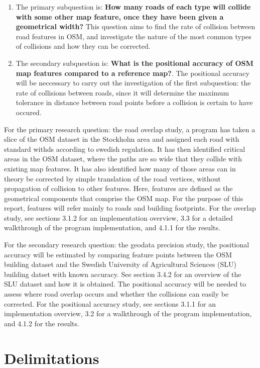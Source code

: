\documentclass{kththesis}
\begin{document}
\begin{enumerate}
    \item The primary subquestion is: \textbf{How many roads of each type will collide with some other map feature, once they have been given a geometrical width?} This question aims to find the rate of collision between road features in OSM, and investigate the nature of the most common types of collisions and how they can be corrected.
    \item The secondary subquestion is: \textbf{What is the positional accuracy of OSM map features compared to a reference map?}. The positional accuracy will be neccessary to carry out the investigation of the first subquestion: the rate of collisions between roads, since it will determine the maximum tolerance in distance between road points before a collision is certain to have occured.
\end{enumerate}

For the primary research question: the road overlap study, a program has taken a slice of the OSM dataset in the Stockholm area and assigned each road with standard withds according to swedish regulation.
It has then identified critical areas in the OSM dataset, where the paths are so wide that they collide with existing map features.
It has also identified how many of those areas can in theory be corrected by simple translation of the road vertices, without propagation of collision to other features.
Here, features are defined as the geometrical components that comprise the OSM map.
For the purpose of this report, features will refer mainly to roads and building footprints.
For the overlap study, see sections 3.1.2 for an implementation overview, 3.3 for a detailed walkthrough of the program implementation, and 4.1.1 for the results.

For the secondary research question: the geodata precision study, the positional accuracy will be estimated by comparing feature points between the OSM building dataset and the Swedish University of Agricultural Sciences (SLU) building datset with known accuracy. See section 3.4.2 for an overview of the SLU dataset and how it is obtained.
The positional accuracy will be needed to assess where road overlap occurs and whether the collisions can easily be corrected.
For the positional accuracy study, see sections 3.1.1 for an implementation overview, 3.2 for a walkthrough of the program implementation, and 4.1.2 for the results.

\section{Delimitations}
\end{document}
